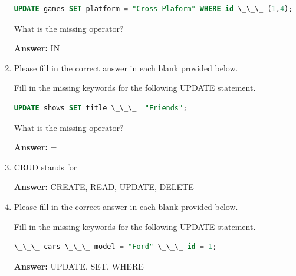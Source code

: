 \documentclass[12pt]{article}
\begin{document}
\begin{enumerate}[1.]
    \begin{lstlisting}[language=SQL]
    UPDATE games SET platform = "Cross-Plaform" WHERE id \_\_\_ (1,4);
    \end{lstlisting}

    \bigskip

    What is the missing operator?

    \bigskip

    \textbf{Answer:} IN


    \item

    Please fill in the correct answer in each blank provided below.

    \bigskip

    Fill in the missing keywords for the following UPDATE statement.

    \bigskip

    \begin{lstlisting}[language=SQL]
    UPDATE shows SET title \_\_\_  "Friends";
    \end{lstlisting}

    \bigskip

    What is the missing operator?

    \bigskip

    \textbf{Answer:} =

    \item

    CRUD stands for

    \bigskip

    \textbf{Answer:} CREATE, READ, UPDATE, DELETE


    \item

    Please fill in the correct answer in each blank provided below.

    \bigskip

    Fill in the missing keywords for the following UPDATE statement.

    \bigskip

    \begin{lstlisting}[language=SQL]
    \_\_\_ cars \_\_\_ model = "Ford" \_\_\_ id = 1;
    \end{lstlisting}

    \bigskip

    \textbf{Answer:} UPDATE, SET, WHERE

\end{enumerate}
\end{document}
